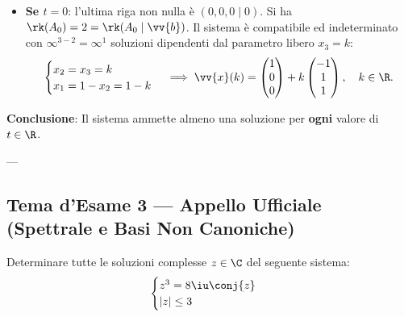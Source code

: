 \begin{dimostrazione}
\begin{itemize}
    \begin{equation}
        \begin{cases}
            -t x_3 = -t \implies x_3 = 1 \\
            x_2 - x_3 = 0 \implies x_2 = 1 \\
            x_1 + x_2 = 1 \implies x_1 = 0
        \end{cases}
        \implies \vv{x} = \begin{pmatrix} 0 \\ 1 \\ 1 \end{pmatrix}.
    \end{equation}
    \item \textbf{Se $t = 0$}: l'ultima riga non nulla è $(0, 0, 0 \mid 0)$. Si ha $\rk(A_0) = 2 = \rk(A_0 \mid \vv{b})$. Il sistema è compatibile ed indeterminato con $\infty^{3-2} = \infty^1$ soluzioni dipendenti dal parametro libero $x_3 = k$:
    \begin{equation}
        \begin{cases}
            x_2 = x_3 = k \\
            x_1 = 1 - x_2 = 1 - k
        \end{cases}
        \implies \vv{x}(k) = \begin{pmatrix} 1 \\ 0 \\ 0 \end{pmatrix} + k \begin{pmatrix} -1 \\ 1 \\ 1 \end{pmatrix}, \quad k \in \R.
    \end{equation}
\end{itemize}
\textbf{Conclusione}: Il sistema ammette almeno una soluzione per \textbf{ogni} valore di $t \in \R$.
\end{dimostrazione}

---

\subsection{Tema d'Esame 3 — Appello Ufficiale (Spettrale e Basi Non Canoniche)}

\begin{tcolorbox}[colback=white, colframe=navyblue, title={\textbf{Testo del Problema 1 — Equazione nel Campo Complesso con Coniugato}}]
Determinare tutte le soluzioni complesse $z \in \C$ del seguente sistema:
\begin{equation}
    \begin{cases}
        z^3 = 8\iu \conj{z} \\
        |z| \le 3
    \end{cases}
\end{equation}
\end{tcolorbox}

